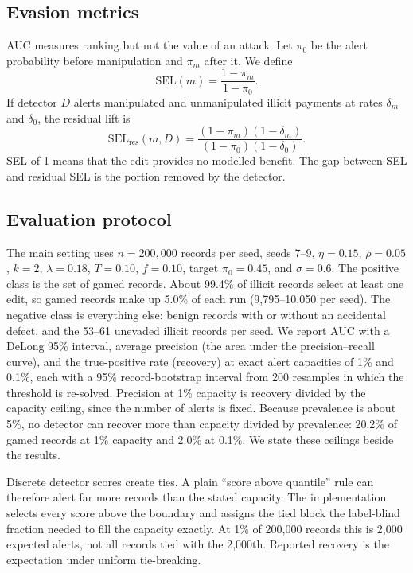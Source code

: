 \documentclass[conference]{IEEEtran}
\begin{document}
\subsection{Evasion metrics}
AUC measures ranking but not the value of an attack. Let $\pi_0$ be the alert
probability before manipulation and $\pi_m$ after it. We define
\begin{equation}
 \mathrm{SEL}(m)=\frac{1-\pi_m}{1-\pi_0}.
 \label{eq:sel}
\end{equation}
If detector $D$ alerts manipulated and unmanipulated illicit payments at rates
$\delta_m$ and $\delta_0$, the residual lift is
\begin{equation}
 \mathrm{SEL}_{\mathrm{res}}(m,D)=
 \frac{(1-\pi_m)(1-\delta_m)}{(1-\pi_0)(1-\delta_0)}.
 \label{eq:selres}
\end{equation}
SEL of 1 means that the edit provides no modelled benefit. The gap between
SEL and residual SEL is the portion removed by the detector.

\subsection{Evaluation protocol}
The main setting uses $n=200{,}000$ records per seed, seeds 7--9, $\eta=0.15$,
$\rho=0.05$, $k=2$, $\lambda=0.18$, $T=0.10$, $f=0.10$, target $\pi_0=0.45$,
and $\sigma=0.6$. The positive class is the set of gamed records. About
99.4\% of illicit records select at least one edit, so gamed
records make up 5.0\% of each run (9{,}795--10{,}050 per seed). The
negative class is everything else: benign records with or without an
accidental defect, and the 53--61 unevaded illicit records per
seed. We report AUC with a DeLong 95\% interval, average precision (the area
under the precision--recall curve), and the true-positive rate (recovery) at
exact alert capacities of 1\% and 0.1\%, each with a 95\% record-bootstrap
interval from 200 resamples in which the threshold is re-solved. Precision at
1\% capacity is recovery divided by the capacity ceiling, since the number
of alerts is fixed. Because prevalence is about 5\%, no detector can recover more than
capacity divided by prevalence: 20.2\% of gamed records at 1\%
capacity and 2.0\% at 0.1\%. We state these ceilings beside the
results.

Discrete detector scores create ties. A plain ``score above quantile'' rule can
therefore alert far more records than the stated capacity. The implementation
selects every score above the boundary and assigns the tied block the
label-blind fraction needed to fill the capacity exactly. At 1\% of 200,000
records this is 2,000 expected alerts, not all records tied with the 2,000th.
Reported recovery is the expectation under uniform tie-breaking.
\end{document}
